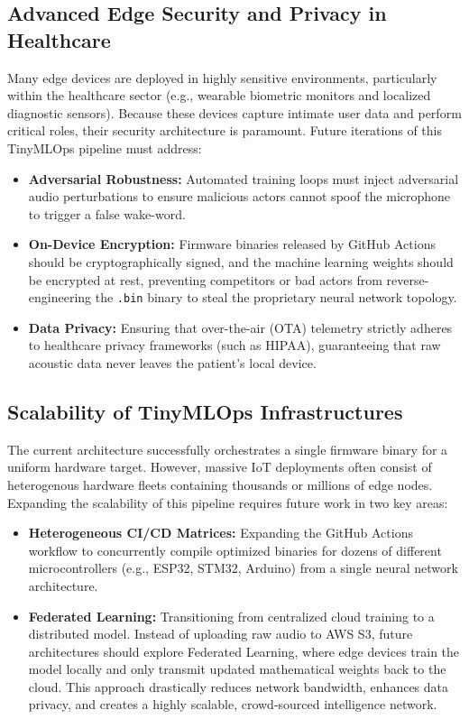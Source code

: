 \documentclass[11pt,a4paper,openany]{book}
\begin{document}
\subsection{Advanced Edge Security and Privacy in Healthcare}
Many edge devices are deployed in highly sensitive environments, particularly within the healthcare sector (e.g., wearable biometric monitors and localized diagnostic sensors). Because these devices capture intimate user data and perform critical roles, their security architecture is paramount. Future iterations of this TinyMLOps pipeline must address:

\begin{itemize}
    \item \textbf{Adversarial Robustness:} Automated training loops must inject adversarial audio perturbations to ensure malicious actors cannot spoof the microphone to trigger a false wake-word.
    \item \textbf{On-Device Encryption:} Firmware binaries released by GitHub Actions should be cryptographically signed, and the machine learning weights should be encrypted at rest, preventing competitors or bad actors from reverse-engineering the \texttt{.bin} binary to steal the proprietary neural network topology.
    \item \textbf{Data Privacy:} Ensuring that over-the-air (OTA) telemetry strictly adheres to healthcare privacy frameworks (such as HIPAA), guaranteeing that raw acoustic data never leaves the patient's local device.
\end{itemize}

\subsection{Scalability of TinyMLOps Infrastructures}
The current architecture successfully orchestrates a single firmware binary for a uniform hardware target. However, massive IoT deployments often consist of heterogenous hardware fleets containing thousands or millions of edge nodes. Expanding the scalability of this pipeline requires future work in two key areas:

\begin{itemize}
    \item \textbf{Heterogeneous CI/CD Matrices:} Expanding the GitHub Actions workflow to concurrently compile optimized binaries for dozens of different microcontrollers (e.g., ESP32, STM32, Arduino) from a single neural network architecture.
    \item \textbf{Federated Learning:} Transitioning from centralized cloud training to a distributed model. Instead of uploading raw audio to AWS S3, future architectures should explore Federated Learning, where edge devices train the model locally and only transmit updated mathematical weights back to the cloud. This approach drastically reduces network bandwidth, enhances data privacy, and creates a highly scalable, crowd-sourced intelligence network.
\end{itemize}
\end{document}
